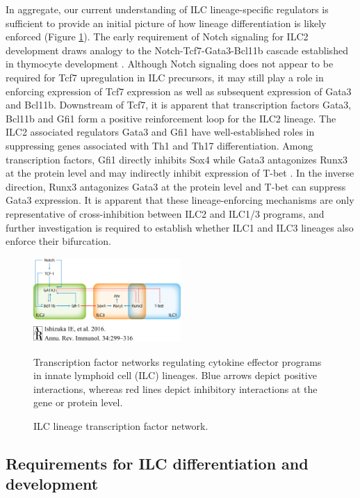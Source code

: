 In aggregate, our current understanding of ILC lineage-specific regulators is sufficient to provide an initial picture of how lineage differentiation is likely enforced (Figure \ref{fig:dis_network}). The early requirement of Notch signaling for ILC2 development draws analogy to the Notch-Tcf7-Gata3-Bcl11b cascade established in thymocyte development \cite{Rothenberg2013}. Although Notch signaling does not appear to be required for Tcf7 upregulation in ILC precursors, it may still play a role in enforcing expression of Tcf7 expression as well as subsequent expression of Gata3 and Bcl11b. Downstream of Tcf7, it is apparent that transcription factors Gata3, Bcl11b and Gfi1 form a positive reinforcement loop for the ILC2 lineage. The ILC2 associated regulators Gata3 and Gfi1 have well-established roles in suppressing genes associated with Th1 and Th17 differentiation. Among transcription factors, Gfi1 directly inhibits Sox4 \cite{Zhu2006,Zhu2009} while Gata3 antagonizes Runx3 at the protein level and may indirectly inhibit expression of T-bet \cite{yagi2010}. In the inverse direction, Runx3 antagonizes Gata3 at the protein level and T-bet can suppress Gata3 expression. It is apparent that these lineage-enforcing mechanisms are only representative of cross-inhibition between ILC2 and ILC1/3 programs, and further investigation is required to establish whether ILC1 and ILC3 lineages also enforce their bifurcation.

\begin{figure}[h]
\begin{center}
	\includegraphics[width=0.5\textwidth]{figures/discussion/Discussion_2_network}
\end{center}
	\caption{ILC lineage transcription factor network.} 
	Transcription factor networks regulating cytokine effector programs in innate lymphoid cell (ILC) lineages. Blue arrows depict positive interactions, whereas red lines depict inhibitory interactions at the gene or protein level.
	\label{fig:dis_network}
\end{figure}

\subsection{Requirements for ILC differentiation and development}

